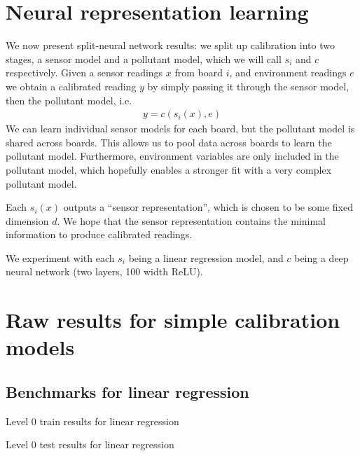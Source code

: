 \documentclass{article}
\begin{document}
\section{Neural representation learning}

We now present split-neural network results: we split
up calibration into two stages, a sensor model
and a pollutant model, which we will call $s_i$ and $c$
respectively.
Given a sensor readings $x$ from board $i$,
and environment readings $e$
we obtain a calibrated reading $y$ by simply passing it through
the sensor model, then the pollutant model, i.e.
\begin{align*}
    y = c(s_i(x), e)
\end{align*}
We can learn individual sensor models for each board,
but the pollutant model is shared across boards. This allows
us to pool data across boards to learn the pollutant model.
Furthermore, environment variables are only 
included in the pollutant model, which hopefully enables
a stronger fit with a very complex pollutant model.

Each $s_i(x)$ outputs a ``sensor representation'', which is chosen
to be some fixed dimension $d$. We hope that the sensor representation
contains the minimal information to produce calibrated readings.

We experiment with each $s_i$ being a linear regression model,
and $c$ being a deep neural network (two layers, 100 width ReLU). 

\appendix
\setcounter{table}{0}
\renewcommand{\thetable}{\Alph{section}.\arabic{table}}

\section{Raw results for simple calibration models}
\label{sec:simpleresults}

\subsection{Benchmarks for linear regression}
\label{sec:results-lr}

\begin{table}[H]
\centering
\scriptsize

\caption{Level 0 train results for linear regression}
\end{table}
\begin{table}[H]
\centering
\scriptsize

\caption{Level 0 test results for linear regression}
\end{table}
\end{document}
